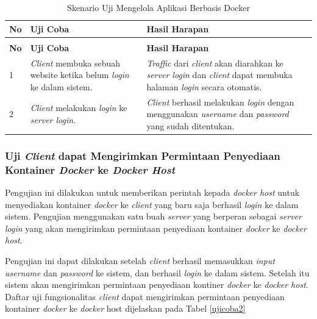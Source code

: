 \begin{longtable}{|p{}|p{}|p{}|}					\caption{Skenario Uji \textit{Client} dapat \textit{Login} ke Dalam Sistem} \label{ujicoba1} \\
	\hline
	\textbf{No} & \textbf{Uji Coba} & \textbf{Hasil Harapan} \\ \hline
	\endfirsthead
	\caption[]{Skenario Uji Mengelola Aplikasi Berbasis Docker} \\
	\hline
	\textbf{No} & \textbf{Uji Coba} & \textbf{Hasil Harapan} \\ \hline
	\endhead
	\endfoot
	\endlastfoot
	
	1 & \textit{Client} membuka sebuah website ketika belum \textit{login} ke dalam sistem. & \textit{Traffic} dari \textit{client} akan diarahkan ke \textit{server login} dan \textit{client} dapat membuka halaman \textit{login} secara otomatis.\\ \hline
	2 & \textit{Client} melakukan \textit{login} ke \textit{server login}. & \textit{Client} berhasil melakukan \textit{login} dengan menggunakan \textit{username} dan \textit{password} yang sudah ditentukan.\\ \hline
\end{longtable}

\subsubsection{Uji \textit{Client} dapat Mengirimkan Permintaan Penyediaan Kontainer \textit{Docker} ke \textit{Docker Host}}
Pengujian ini dilakukan untuk memberikan perintah kepada \textit{docker host} untuk menyediakan kontainer \textit{docker} ke \textit{client} yang baru saja berhasil \textit{login} ke dalam sistem. Pengujian menggunakan satu buah \textit{server} yang berperan sebagai \textit{server login} yang akan mengirimkan permintaan penyediaan kontainer \textit{docker} ke \textit{docker host}.

Pengujian ini dapat dilakukan setelah \textit{client} berhasil memasukkan \textit{input username} dan \textit{password} ke sistem, dan berhasil \textit{login} ke dalam sistem. Setelah itu sistem akan mengirimkan permintaan penyediaan kontiner \textit{docker} ke \textit{docker host}. Daftar uji fungsionalitas \textit{client} dapat mengirimkan permintaan penyediaan kontainer \textit{docker} ke \textit{docker} host dijelaskan pada Tabel \ref{ujicoba2}

